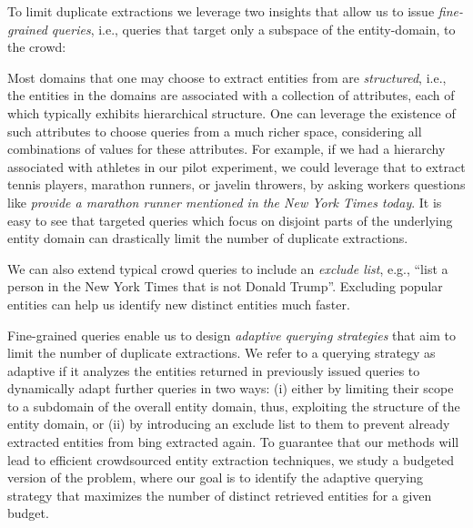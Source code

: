  To limit duplicate extractions we leverage two insights that allow us to issue {\em fine-grained queries}, i.e., queries that target only a subspace of the entity-domain, to the crowd:

Most domains that one may choose to extract entities from are {\em structured}, i.e., the entities in the domains are associated with a collection of attributes, each of which typically exhibits hierarchical structure. One can leverage the existence of such attributes to choose queries from a much richer space, considering all combinations of values for these attributes. For example, if we had a hierarchy associated with athletes in our pilot experiment, we could leverage that to extract tennis players, marathon runners, or javelin throwers, by asking workers questions like {\em provide a marathon runner mentioned in the New York Times today}. It is easy to see that targeted queries which focus on disjoint parts of the underlying entity domain can drastically limit the number of duplicate extractions.

 We can also extend typical crowd queries to include an {\em exclude list}, e.g., ``list a person in the New York Times that is not Donald Trump''.  Excluding popular entities can help us identify new distinct entities much faster.

Fine-grained queries enable us to design {\em adaptive querying strategies} that aim to limit the number of duplicate extractions. We refer to a querying strategy as adaptive if it analyzes the entities returned in previously issued queries to dynamically adapt further queries in two ways: (i) either by limiting their scope to a subdomain of the overall entity domain, thus, exploiting the structure of the entity domain, or (ii) by introducing an exclude list to them to prevent already extracted entities from bing extracted again. To guarantee that our methods will lead to efficient crowdsourced entity extraction techniques, we study a budgeted version of the problem, where our goal is to identify the adaptive querying strategy that maximizes the number of distinct retrieved entities for a given budget.


